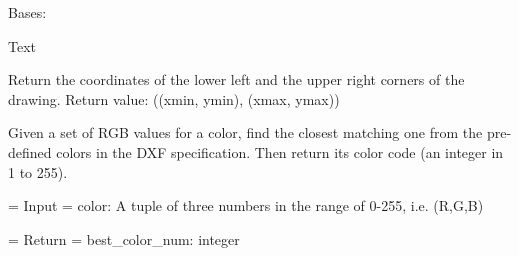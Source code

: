 \documentclass[letterpaper,10pt,english]{sphinxmanual}
\begin{document}
\begin{fulllineitems}
\label{api/gtrace.draw:gtrace.draw.dxf.Text}
Bases: {\hyperref[api/gtrace.draw:gtrace.draw.dxf.Entity]{}}

Text

\begin{fulllineitems}
\label{api/gtrace.draw:gtrace.draw.dxf.Text.draw}
\end{fulllineitems}


\begin{fulllineitems}
\label{api/gtrace.draw:gtrace.draw.dxf.Text.report_min_max}
Return the coordinates of the lower left and the upper right corners
of the drawing.
Return value: ((xmin, ymin), (xmax, ymax))

\end{fulllineitems}


\end{fulllineitems}


\begin{fulllineitems}
\label{api/gtrace.draw:gtrace.draw.dxf.color_encode}
Given a set of RGB values for a color, find the closest matching
one from the pre-defined colors in the DXF specification.
Then return its color code (an integer in 1 to 255).

= Input =
color: A tuple of three numbers in the range of 0-255, i.e. (R,G,B)

= Return =
best\_color\_num: integer

\end{fulllineitems}


\begin{fulllineitems}
\label{api/gtrace.draw:gtrace.draw.dxf.test_func}
\end{fulllineitems}
\end{document}
